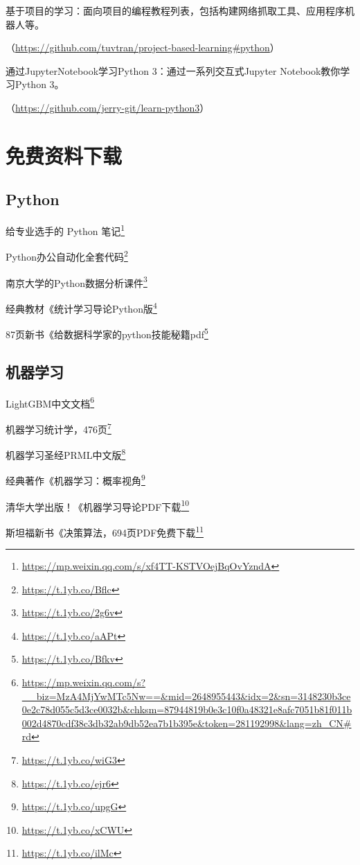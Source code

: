 \documentclass[]{ctexbook}
\renewcommand{\href}[2]{#2\footnote{\url{#1}}}
\begin{document}
基于项目的学习：面向项目的编程教程列表，包括构建网络抓取工具、应用程序机器人等。

（\url{https://github.com/tuvtran/project-based-learning\#python}）

通过JupyterNotebook学习Python 3：通过一系列交互式Jupyter Notebook教你学习Python 3。

（\url{https://github.com/jerry-git/learn-python3}）

\hypertarget{ux514dux8d39ux8d44ux6599ux4e0bux8f7d}{%
\chapter{免费资料下载}\label{ux514dux8d39ux8d44ux6599ux4e0bux8f7d}}

\hypertarget{python-2}{%
\section{Python}\label{python-2}}

\href{https://mp.weixin.qq.com/s/xf4TT-KSTVOejBqOvYzndA}{给专业选手的 Python 笔记}

\href{https://t.1yb.co/Bflc}{Python办公自动化全套代码}

\href{https://t.1yb.co/2g6v}{南京大学的Python数据分析课件}

\href{https://t.1yb.co/aAPt}{经典教材《统计学习导论Python版}

\href{https://t.1yb.co/Bfkv}{87页新书《给数据科学家的python技能秘籍pdf}

\hypertarget{ux673aux5668ux5b66ux4e60-1}{%
\section{机器学习}\label{ux673aux5668ux5b66ux4e60-1}}

\href{https://mp.weixin.qq.com/s?__biz=MzA4MjYwMTc5Nw==\&mid=2648955443\&idx=2\&sn=3148230b3ce0e2c78d055c5d3ce0032b\&chksm=87944819b0e3c10f0a48321e8afc7051b81f011b002d4870cdf38c3db32ab9db52ea7b1b395e\&token=281192998\&lang=zh_CN\#rd}{LightGBM中文文档}

\href{https://t.1yb.co/wiG3}{机器学习统计学，476页}

\href{https://t.1yb.co/ejr6}{机器学习圣经PRML中文版}

\href{https://t.1yb.co/upgG}{经典著作《机器学习：概率视角}

\href{https://t.1yb.co/xCWU}{清华大学出版！《机器学习导论PDF下载}

\href{https://t.1yb.co/ilMc}{斯坦福新书《决策算法，694页PDF免费下载}
\end{document}
